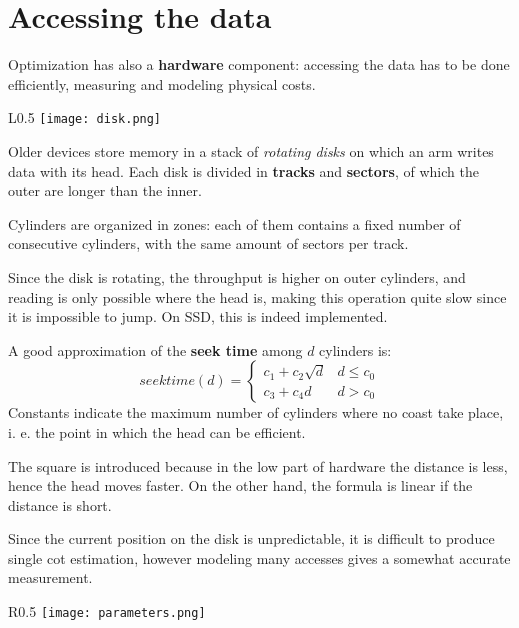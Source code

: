 \section{Accessing the data}
Optimization has also a \textbf{hardware} component: accessing the data has to be done efficiently, measuring and modeling physical costs. 

\begin{wrapfigure}{L}{0.5\textwidth}
	\vspace{-15pt}
	\texttt{[image: disk.png]}
	\vspace{-25pt}
\end{wrapfigure}

Older devices store memory in a stack of \textit{rotating disks} on which an arm writes data with its head. Each disk is divided in \textbf{tracks} and \textbf{sectors}, of which the outer are longer than the inner.

Cylinders are organized in zones: each of them contains a fixed number of consecutive cylinders, with the same amount of sectors per track. 

Since the disk is rotating, the throughput is higher on outer cylinders, and reading is only possible where the head is, making this operation quite slow since it is impossible to jump. On SSD, this is indeed implemented.

A good approximation of the \textbf{seek time} among $d$ cylinders is:
$$seektime(d) = \begin{cases}
	c_1 + c_2\sqrt{d} & d \leq c_0 \\
	c_3 + c_4d & d> c_0
\end{cases}$$
Constants indicate the maximum number of cylinders where no coast take place, i. e. the point in which the head can be efficient. 

The square is introduced because in the low part of hardware the distance is less, hence the head moves faster. On the other hand, the formula is linear if the distance is short.

Since the current position on the disk is unpredictable, it is difficult to produce single cot estimation, however modeling many accesses gives a somewhat accurate measurement. 

\begin{wrapfigure}{R}{0.5\textwidth}
	\vspace{-15pt}
	\texttt{[image: parameters.png]}
	\vspace{-30pt}
\end{wrapfigure}

